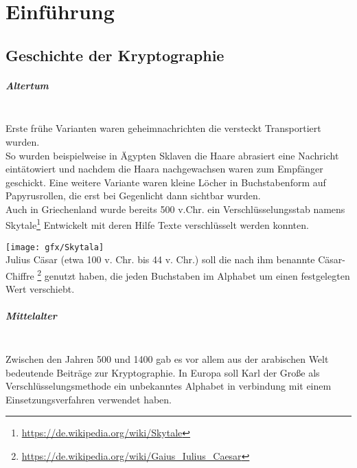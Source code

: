 
\chapter{Einführung} %

\label{ch:introduction} %


\section{Geschichte der Kryptographie}


\paragraph{Altertum}
\hfill\\
Erste frühe Varianten waren geheimnachrichten die versteckt Transportiert wurden.\\
So wurden beispielweise in Ägypten Sklaven die Haare abrasiert eine Nachricht eintätowiert und nachdem die Haara nachgewachsen waren zum Empfänger geschickt.
Eine weitere Variante waren kleine Löcher in Buchstabenform auf Papyrusrollen, die erst bei Gegenlicht dann sichtbar wurden.
\\ Auch in Griechenland wurde bereits 500 v.Chr. ein Verschlüsselungsstab namens Skytale\footnote{\url{https://de.wikipedia.org/wiki/Skytale}} Entwickelt mit deren Hilfe Texte verschlüsselt werden konnten.

\texttt{[image: gfx/Skytala]}%
\hfill
\\ Julius Cäsar (etwa 100 v. Chr. bis 44 v. Chr.) soll die nach ihm benannte Cäsar-Chiffre \footnote{\url{https://de.wikipedia.org/wiki/Gaius_Iulius_Caesar}} genutzt haben, die jeden Buchstaben im Alphabet um einen festgelegten Wert verschiebt.


\paragraph{Mittelalter}
\hfill\\
\citeauthor{al-kadi}Zwischen den Jahren 500 und 1400 gab es vor allem aus der arabischen Welt bedeutende Beiträge zur Kryptographie.\citep{al-kadi}
In Europa soll Karl der Große als Verschlüsselungsmethode ein unbekanntes Alphabet in verbindung mit einem Einsetzungsverfahren verwendet haben.
\newpage

